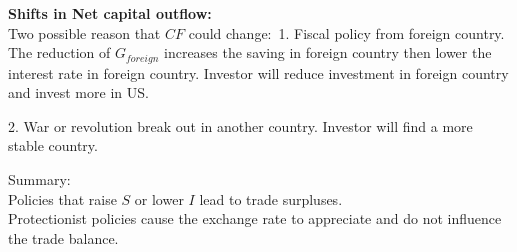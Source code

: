 \documentclass[12pt]{article}
\begin{document}
\begin{figure}[H]
\end{figure}




{\textbf {Shifts in Net capital outflow:}}\\
Two possible reason that $ CF $ could change:\
1. Fiscal policy from foreign country. The reduction of $ G_{foreign} $ increases the
saving in foreign country then lower the interest rate in foreign country. Investor
will reduce investment in foreign country and invest more in US.

2. War or revolution break out in another country. Investor will find a more stable
country.






\begin{figure}[H]
\end{figure}



Summary:\\
Policies that raise $ S $ or lower $ I $ lead to trade surpluses.\\
Protectionist policies cause the exchange rate to appreciate and do not influence
the trade balance.
\end{document}

